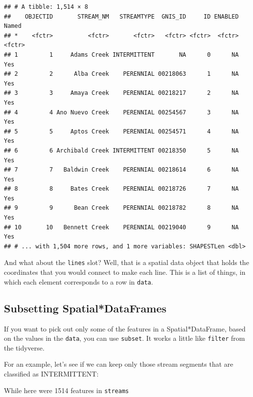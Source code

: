 \documentclass[]{book}
\newenvironment{Shaded}{\begin{snugshade}}{\end{snugshade}}
\newcommand{\KeywordTok}[1]{\textcolor[rgb]{0.13,0.29,0.53}{\textbf{{#1}}}}
\newcommand{\StringTok}[1]{\textcolor[rgb]{0.31,0.60,0.02}{{#1}}}
\newcommand{\NormalTok}[1]{{#1}}
\theoremstyle{definition}
\theoremstyle{definition}
\theoremstyle{remark}
\begin{document}
\begin{verbatim}
## # A tibble: 1,514 × 8
##    OBJECTID       STREAM_NM   STREAMTYPE  GNIS_ID     ID ENABLED  Named
## *    <fctr>          <fctr>       <fctr>   <fctr> <fctr>  <fctr> <fctr>
## 1         1     Adams Creek INTERMITTENT       NA      0      NA    Yes
## 2         2      Alba Creek    PERENNIAL 00218063      1      NA    Yes
## 3         3     Amaya Creek    PERENNIAL 00218217      2      NA    Yes
## 4         4 Ano Nuevo Creek    PERENNIAL 00254567      3      NA    Yes
## 5         5     Aptos Creek    PERENNIAL 00254571      4      NA    Yes
## 6         6 Archibald Creek INTERMITTENT 00218350      5      NA    Yes
## 7         7   Baldwin Creek    PERENNIAL 00218614      6      NA    Yes
## 8         8     Bates Creek    PERENNIAL 00218726      7      NA    Yes
## 9         9      Bean Creek    PERENNIAL 00218782      8      NA    Yes
## 10       10   Bennett Creek    PERENNIAL 00219040      9      NA    Yes
## # ... with 1,504 more rows, and 1 more variables: SHAPESTLen <dbl>
\end{verbatim}

And what about the \texttt{lines} slot? Well, that is a spatial data
object that holds the coordinates that you would connect to make each
line. This is a list of things, in which each element corresponds to a
row in \texttt{data}.

\subsection{Subsetting
Spatial*DataFrames}\label{subsetting-spatialdataframes}

If you want to pick out only some of the features in a
Spatial*DataFrame, based on the values in the \texttt{data}, you can use
\texttt{subset}. It works a little like \texttt{filter} from the
tidyverse.

For an example, let's see if we can keep only those stream segments that
are classified as INTERMITTENT:

\begin{Shaded}
\end{Shaded}

While here were 1514 features in \texttt{streams}
\end{document}
